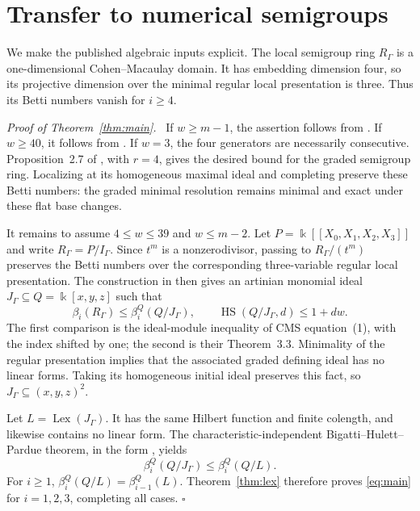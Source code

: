 \documentclass[11pt,a4paper]{article}
\newenvironment{proof}[1][Proof]{\par\noindent\textit{#1.}\ \ignorespaces}{\unskip\nobreak\hfill\ensuremath{\square}\par}
\newcommand{\kk}{\Bbbk}
\newcommand{\HS}{\operatorname{HS}}
\newcommand{\Lex}{\operatorname{Lex}}
\newcommand{\llbracket}{[\![}
\newcommand{\rrbracket}{]\!]}
\begin{document}
\section{Transfer to numerical semigroups}\label{sec:transfer}
We make the published algebraic inputs explicit. The local semigroup ring $R_\Gamma$ is a one-dimensional Cohen--Macaulay domain. It has embedding dimension four, so its projective dimension over the minimal regular local presentation is three. Thus its Betti numbers vanish for $i\ge4$.

\begin{proof}[Proof of Theorem~\ref{thm:main}]
If $w\ge m-1$, the assertion follows from \cite[Corollary~2.4]{CMS}. If $w\ge40$, it follows from \cite[Theorem~1.5]{CMS}. If $w=3$, the four generators are necessarily consecutive. Proposition~2.7 of \cite{HS}, with $r=4$, gives the desired bound for the graded semigroup ring. Localizing at its homogeneous maximal ideal and completing preserve these Betti numbers: the graded minimal resolution remains minimal and exact under these flat base changes.

It remains to assume $4\le w\le39$ and $w\le m-2$. Let $P=\kk\llbracket X_0,X_1,X_2,X_3\rrbracket$ and write $R_\Gamma=P/I_\Gamma$. Since $t^m$ is a nonzerodivisor, passing to $R_\Gamma/(t^m)$ preserves the Betti numbers over the corresponding three-variable regular local presentation. The construction in \cite[Sections~2--3]{CMS} then gives an artinian monomial ideal $J_\Gamma\subseteq Q=\kk[x,y,z]$ such that
\begin{equation}\label{eq:comparison}
 \beta_i(R_\Gamma)\le\beta_i^Q(Q/J_\Gamma),\qquad
 \HS(Q/J_\Gamma,d)\le1+dw.
\end{equation}
The first comparison is the ideal-module inequality of CMS equation~(1), with the index shifted by one; the second is their Theorem~3.3. Minimality of the regular presentation implies that the associated graded defining ideal has no linear forms. Taking its homogeneous initial ideal preserves this fact, so $J_\Gamma\subseteq(x,y,z)^2$.

Let $L=\Lex(J_\Gamma)$. It has the same Hilbert function and finite colength, and likewise contains no linear form. The characteristic-independent Bigatti--Hulett--Pardue theorem, in the form \cite[Theorem~2.1]{CMS}, yields
\[
 \beta_i^Q(Q/J_\Gamma)\le\beta_i^Q(Q/L).
\]
For $i\ge1$, $\beta_i^Q(Q/L)=\beta_{i-1}^Q(L)$. Theorem~\ref{thm:lex} therefore proves \eqref{eq:main} for $i=1,2,3$, completing all cases.
\end{proof}
\end{document}
